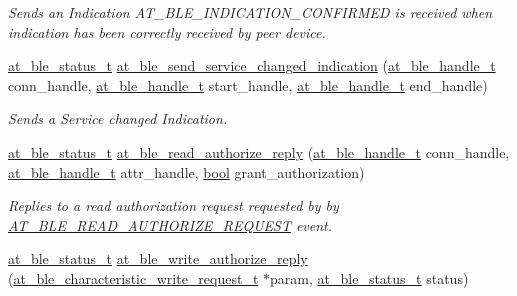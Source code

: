 \begin{DoxyCompactItemize}
\begin{DoxyCompactList}\small\item\em Sends an Indication A\+T\+\_\+\+B\+L\+E\+\_\+\+I\+N\+D\+I\+C\+A\+T\+I\+O\+N\+\_\+\+C\+O\+N\+F\+I\+R\+M\+ED is received when indication has been correctly received by peer device. \end{DoxyCompactList}\item 
\mbox{\hyperlink{group__error__codes__group_ga3b1db9b95feb157b3c188ca27fe76988}{at\+\_\+ble\+\_\+status\+\_\+t}} \mbox{\hyperlink{group__gatt__server__group_ga89b3ecb2404461014e383ce0ca7b98c0}{at\+\_\+ble\+\_\+send\+\_\+service\+\_\+changed\+\_\+indication}} (\mbox{\hyperlink{at__ble__api_8h_abd23646d0c662860741f787efc8456f2}{at\+\_\+ble\+\_\+handle\+\_\+t}} conn\+\_\+handle, \mbox{\hyperlink{at__ble__api_8h_abd23646d0c662860741f787efc8456f2}{at\+\_\+ble\+\_\+handle\+\_\+t}} start\+\_\+handle, \mbox{\hyperlink{at__ble__api_8h_abd23646d0c662860741f787efc8456f2}{at\+\_\+ble\+\_\+handle\+\_\+t}} end\+\_\+handle)
\begin{DoxyCompactList}\small\item\em Sends a Service changed Indication. \end{DoxyCompactList}\item 
\mbox{\hyperlink{group__error__codes__group_ga3b1db9b95feb157b3c188ca27fe76988}{at\+\_\+ble\+\_\+status\+\_\+t}} \mbox{\hyperlink{group__gatt__server__group_ga2c9e2f91364533457751646648246304}{at\+\_\+ble\+\_\+read\+\_\+authorize\+\_\+reply}} (\mbox{\hyperlink{at__ble__api_8h_abd23646d0c662860741f787efc8456f2}{at\+\_\+ble\+\_\+handle\+\_\+t}} conn\+\_\+handle, \mbox{\hyperlink{at__ble__api_8h_abd23646d0c662860741f787efc8456f2}{at\+\_\+ble\+\_\+handle\+\_\+t}} attr\+\_\+handle, \mbox{\hyperlink{group__group__sam0__utils_ga97a80ca1602ebf2303258971a2c938e2}{bool}} grant\+\_\+authorization)
\begin{DoxyCompactList}\small\item\em Replies to a read authorization request requested by by \mbox{\hyperlink{at__ble__api_8h_a3324640b95f33169515f89738ed5baebae51c46b66e7d933258c512f0ea0b7acd}{A\+T\+\_\+\+B\+L\+E\+\_\+\+R\+E\+A\+D\+\_\+\+A\+U\+T\+H\+O\+R\+I\+Z\+E\+\_\+\+R\+E\+Q\+U\+E\+ST}} event. \end{DoxyCompactList}\item 
\mbox{\hyperlink{group__error__codes__group_ga3b1db9b95feb157b3c188ca27fe76988}{at\+\_\+ble\+\_\+status\+\_\+t}} \mbox{\hyperlink{group__gatt__server__group_gaf68dba9223f2fd2828ec74ce9a9f9f8e}{at\+\_\+ble\+\_\+write\+\_\+authorize\+\_\+reply}} (\mbox{\hyperlink{structat__ble__characteristic__write__request__t}{at\+\_\+ble\+\_\+characteristic\+\_\+write\+\_\+request\+\_\+t}} $\ast$param, \mbox{\hyperlink{group__error__codes__group_ga3b1db9b95feb157b3c188ca27fe76988}{at\+\_\+ble\+\_\+status\+\_\+t}} status)

\end{DoxyCompactItemize}
